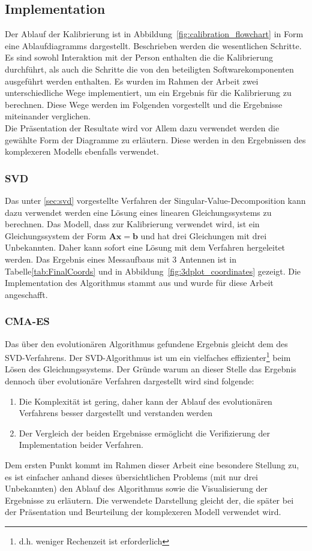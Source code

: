\subsection{Implementation}
%
Der Ablauf der Kalibrierung ist in Abbildung~\ref{fig:calibration_flowchart} in Form eine Ablaufdiagramms dargestellt. Beschrieben werden die wesentlichen Schritte. Es sind sowohl Interaktion mit der Person enthalten die die Kalibrierung durchführt, als auch die Schritte die von den beteiligten Softwarekomponenten ausgeführt werden enthalten. Es wurden im Rahmen der Arbeit zwei unterschiedliche Wege implementiert, um ein Ergebnis für die Kalibrierung zu berechnen. Diese Wege werden im Folgenden vorgestellt und die Ergebnisse miteinander verglichen.\\
Die Präsentation der Resultate wird vor Allem dazu verwendet werden die gewählte Form der Diagramme zu erläutern. Diese werden in den Ergebnissen des komplexeren Modells ebenfalls verwendet.
%
\subsubsection{SVD}
%
Das unter \ref{sec:svd} vorgestellte Verfahren der Singular-Value-Decomposition kann dazu verwendet werden eine Lösung eines linearen Gleichungssystems zu berechnen. Das Modell, dass zur Kalibrierung verwendet wird, ist ein Gleichungssystem der Form $\mathbf{A}\mathbf{x}=\mathbf{b}$ und hat drei Gleichungen mit drei Unbekannten. Daher kann sofort eine Lösung mit dem Verfahren hergeleitet werden. Das Ergebnis eines Messaufbaus mit 3 Antennen ist in Tabelle\ref{tab:FinalCoords} und in Abbildung~\ref{fig:3dplot_coordinates} gezeigt. Die Implementation des Algorithmus stammt aus \cite{press2007numerical} und wurde für diese Arbeit angeschafft.
%
\subsubsection{CMA-ES}
Das über den evolutionären Algorithmus gefundene Ergebnis gleicht dem des SVD-Verfahrens. Der SVD-Algorithmus ist um ein vielfaches effizienter\footnote{d.h. weniger Rechenzeit ist erforderlich} beim Lösen des Gleichungssystems. Der Gründe warum an dieser Stelle das Ergebnis dennoch über evolutionäre Verfahren dargestellt wird sind folgende:
%
\begin{enumerate}
 \item Die Komplexität ist gering, daher kann der Ablauf des evolutionären Verfahrens besser dargestellt und verstanden werden
 \item Der Vergleich der beiden Ergebnisse ermöglicht die Verifizierung der Implementation beider Verfahren.
\end{enumerate}
%
Dem ersten Punkt kommt im Rahmen dieser Arbeit eine besondere Stellung zu, es ist einfacher anhand dieses übersichtlichen Problems (mit nur drei Unbekannten) den Ablauf des Algorithmus sowie die Visualisierung der Ergebnisse zu erläutern. Die verwendete Darstellung gleicht der, die später bei der Präsentation und Beurteilung der komplexeren Modell verwendet wird.
%

%
